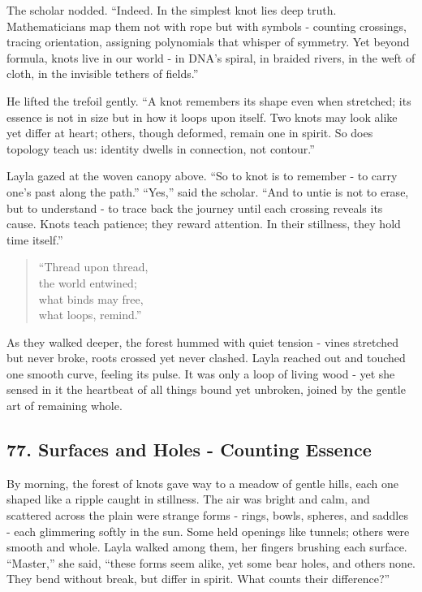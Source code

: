 \documentclass[
  letterpaper,
  DIV=11,
  numbers=noendperiod]{scrreprt}
\begin{document}
The scholar nodded. ``Indeed. In the simplest knot lies deep truth.
Mathematicians map them not with rope but with symbols - counting
crossings, tracing orientation, assigning polynomials that whisper of
symmetry. Yet beyond formula, knots live in our world - in DNA's spiral,
in braided rivers, in the weft of cloth, in the invisible tethers of
fields.''

He lifted the trefoil gently. ``A knot remembers its shape even when
stretched; its essence is not in size but in how it loops upon itself.
Two knots may look alike yet differ at heart; others, though deformed,
remain one in spirit. So does topology teach us: identity dwells in
connection, not contour.''

Layla gazed at the woven canopy above. ``So to knot is to remember - to
carry one's past along the path.'' ``Yes,'' said the scholar. ``And to
untie is not to erase, but to understand - to trace back the journey
until each crossing reveals its cause. Knots teach patience; they reward
attention. In their stillness, they hold time itself.''

\begin{quote}
``Thread upon thread,\\
the world entwined;\\
what binds may free,\\
what loops, remind.''
\end{quote}

As they walked deeper, the forest hummed with quiet tension - vines
stretched but never broke, roots crossed yet never clashed. Layla
reached out and touched one smooth curve, feeling its pulse. It was only
a loop of living wood - yet she sensed in it the heartbeat of all things
bound yet unbroken, joined by the gentle art of remaining whole.

\subsection{77. Surfaces and Holes - Counting
Essence}\label{surfaces-and-holes---counting-essence}

By morning, the forest of knots gave way to a meadow of gentle hills,
each one shaped like a ripple caught in stillness. The air was bright
and calm, and scattered across the plain were strange forms - rings,
bowls, spheres, and saddles - each glimmering softly in the sun. Some
held openings like tunnels; others were smooth and whole. Layla walked
among them, her fingers brushing each surface. ``Master,'' she said,
``these forms seem alike, yet some bear holes, and others none. They
bend without break, but differ in spirit. What counts their
difference?''
\end{document}
